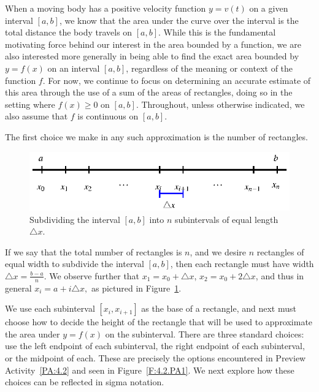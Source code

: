 When a moving body has a positive velocity function $y = v(t)$ on a given interval $[a,b]$, we know that the area under the curve over the interval is the total distance the body travels on $[a,b]$.  While this is the fundamental motivating force behind our interest in the area bounded by a function, we are also interested more generally in being able to find the exact area bounded by $y = f(x)$ on an interval $[a,b]$, regardless of the meaning or context of the function $f$.  For now, we continue to focus on determining an accurate estimate of this area through the use of a sum of the areas of rectangles, doing so in the setting where $f(x) \ge 0$ on $[a,b]$.  Throughout, unless otherwise indicated, we also assume that $f$ is continuous on $[a,b]$.

The first choice we make in any such approximation is the number of rectangles.  
\begin{figure}[h]
\begin{center}
\includegraphics{figures/4_2_Interval.eps}
\caption{Subdividing the interval $[a,b]$ into $n$ subintervals of equal length $\triangle x$.} \label{F:4.2.Interval}
\end{center}
\end{figure}
If we say that the total number of rectangles is $n$, and we desire $n$ rectangles of equal width to subdivide the interval $[a,b]$, then each rectangle must have width $\triangle x = \frac{b-a}{n}$. We observe further that $x_1 = x_0 + \triangle x$, $x_2 = x_0 + 2 \triangle x$, and thus in general $x_{i} = a + i\triangle x,$ as pictured in Figure~\ref{F:4.2.Interval}.

We use each subinterval $[x_i, x_{i+1}]$ as the base of a rectangle, and next must choose how to decide the height of the rectangle that will be used to approximate the area under $y = f(x)$ on the subinterval.  There are three standard choices:  use the left endpoint of each subinterval, the right endpoint of each subinterval, or the midpoint of each.  These are precisely the options encountered in Preview Activity~\ref{PA:4.2} and seen in Figure~\ref{F:4.2.PA1}.  We next explore how these choices can be reflected in sigma notation.

